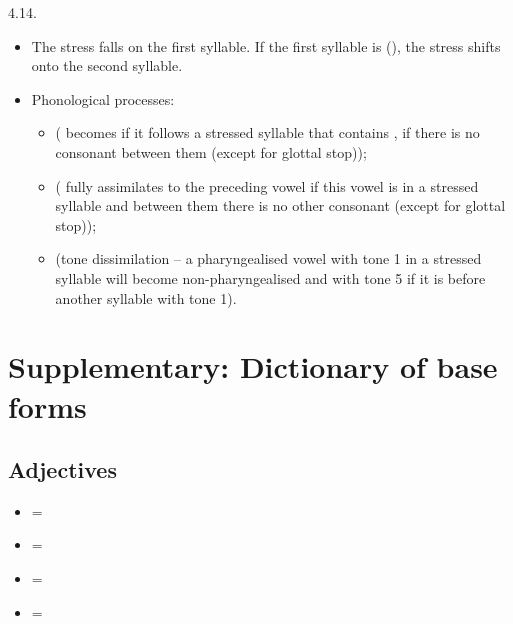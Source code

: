 \begin{refsection}
\begin{practiceproblemsolution}{4.14. \langnameTicuna}
\begin{itemize}
\begin{itemize}
 \centerline{}
        \item The stress falls on the first syllable. If the first syllable is  (), the stress shifts onto the second syllable.
        \item Phonological processes:
        \begin{itemize}
            \item {} ( becomes  if it follows a stressed syllable that contains , if there is no consonant between them (except for glottal stop));
        \item {} ( fully assimilates to the preceding vowel if this vowel is in a stressed syllable and between them there is no other consonant  (except for glottal stop));
        \item {} (tone dissimilation -- a pharyngealised vowel with tone 1 in a stressed syllable will become non-pharyn\-geal\-ised and with tone 5 if it is before another syllable with tone 1).
        \end{itemize}
    \end{itemize}
    \end{itemize}


\section*{Supplementary: Dictionary of base forms}

\subsection*{Adjectives}

\begin{multicols}{2}
    \begin{itemize}
        \item[]  = 
        \item[]  = 
        \item[]  = 
        \item[]  = 
    \end{itemize}
\end{multicols}


\end{practiceproblemsolution}
\end{refsection}
